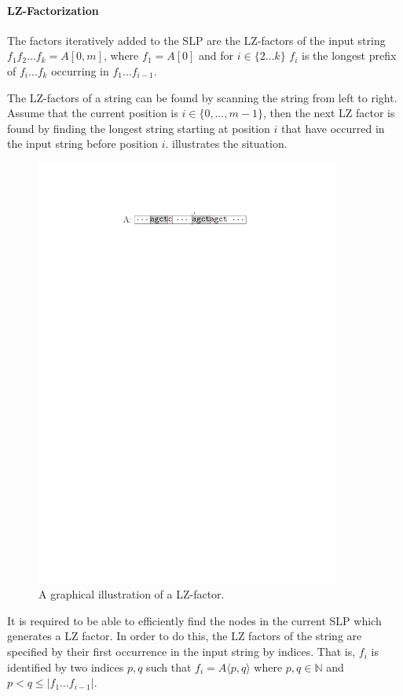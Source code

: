 \documentclass[twoside,11pt,openright]{report}
\newcommand{\substr}[3]{#1\langle #2, #3 \rangle}
\newcommand{\str}[3]{#1[#2, #3]}
\begin{document}
\paragraph{LZ-Factorization}
The factors iteratively added to the SLP are the LZ-factors of the input string $f_1 f_2 \dots f_k = \str{A}{0}{m}$, where $f_1 = A[0]$ and for $i \in \{2 \dots k\}$ $f_i$ is the longest prefix of $f_i \dots f_k$ occurring in $f_1 \dots f_{i - 1}$.

The LZ-factors of a string can be found by scanning the string from left to right. Assume that the current position is $i \in \{0, \dots, m - 1\}$, then the next LZ factor is found by finding the longest string starting at position $i$ that have occurred in the input string before position $i$.  illustrates the situation.

\begin{figure}[!htb]
  \centering
  \includegraphics[width=10cm]{images/lz-factor}
  \caption{A graphical illustration of a LZ-factor.}
  \label{fig:lz-factor}
\end{figure}

It is required to be able to efficiently find the nodes in the current SLP which generates a LZ factor. In order to do this, the LZ factors of the string are specified by their first occurrence in the input string by indices. That is, $f_i$ is identified by two indices $p, q$ such that $f_i = \substr{A}{p}{q}$ where $p,q \in \mathbb{N}$ and $p < q \leq |f_1 \dots f_{i - 1}|$.
\end{document}
